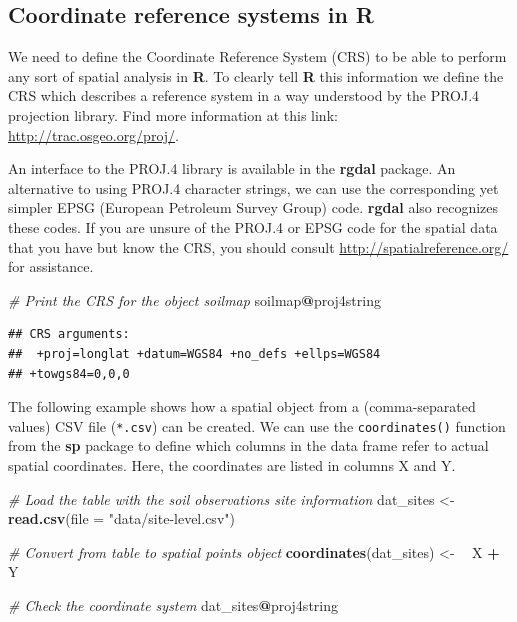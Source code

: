 \documentclass[10pt,b5paper,]{book}
\newenvironment{Shaded}{\begin{snugshade}}{\end{snugshade}}
\newcommand{\CommentTok}[1]{\textcolor[rgb]{0.56,0.35,0.01}{\textit{#1}}}
\newcommand{\DataTypeTok}[1]{\textcolor[rgb]{0.13,0.29,0.53}{#1}}
\newcommand{\ErrorTok}[1]{\textcolor[rgb]{0.64,0.00,0.00}{\textbf{#1}}}
\newcommand{\KeywordTok}[1]{\textcolor[rgb]{0.13,0.29,0.53}{\textbf{#1}}}
\newcommand{\NormalTok}[1]{#1}
\newcommand{\OperatorTok}[1]{\textcolor[rgb]{0.81,0.36,0.00}{\textbf{#1}}}
\newcommand{\StringTok}[1]{\textcolor[rgb]{0.31,0.60,0.02}{#1}}
\theoremstyle{definition}
\theoremstyle{definition}
\theoremstyle{definition}
\theoremstyle{remark}
\begin{document}
\hypertarget{coordinate-reference-systems-in-r}{%
\subsection{Coordinate reference systems in
R}\label{coordinate-reference-systems-in-r}}

We need to define the Coordinate Reference System (CRS) to be able to
perform any sort of spatial analysis in \textbf{R}. To clearly tell
\textbf{R} this information we define the CRS which describes a
reference system in a way understood by the PROJ.4 projection library.
Find more information at this link: \url{http://trac.osgeo.org/proj/}.

An interface to the PROJ.4 library is available in the \textbf{rgdal}
package. An alternative to using PROJ.4 character strings, we can use
the corresponding yet simpler EPSG (European Petroleum Survey Group)
code. \textbf{rgdal} also recognizes these codes. If you are unsure of
the PROJ.4 or EPSG code for the spatial data that you have but know the
CRS, you should consult \url{http://spatialreference.org/} for
assistance.

\begin{Shaded}
\begin{Highlighting}[]
\CommentTok{# Print the CRS for the object soilmap}
\NormalTok{soilmap}\OperatorTok{@}\NormalTok{proj4string}
\end{Highlighting}
\end{Shaded}

\begin{verbatim}
## CRS arguments:
##  +proj=longlat +datum=WGS84 +no_defs +ellps=WGS84
## +towgs84=0,0,0
\end{verbatim}

The following example shows how a spatial object from a (comma-separated
values) CSV file (\texttt{*.csv}) can be created. We can use the
\texttt{coordinates()} function from the \textbf{sp} package to define
which columns in the data frame refer to actual spatial coordinates.
Here, the coordinates are listed in columns X and Y.

\begin{Shaded}
\begin{Highlighting}[]
\CommentTok{# Load the table with the soil observations site information}
\NormalTok{dat_sites <-}\StringTok{ }\KeywordTok{read.csv}\NormalTok{(}\DataTypeTok{file =} \StringTok{"data/site-level.csv"}\NormalTok{)}

\CommentTok{# Convert from table to spatial points object}
\KeywordTok{coordinates}\NormalTok{(dat_sites) <-}\StringTok{ }\ErrorTok{~}\StringTok{ }\NormalTok{X }\OperatorTok{+}\StringTok{ }\NormalTok{Y}

\CommentTok{# Check the coordinate system}
\NormalTok{dat_sites}\OperatorTok{@}\NormalTok{proj4string}
\end{Highlighting}
\end{Shaded}
\end{document}
